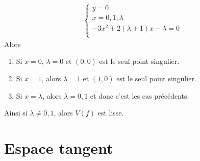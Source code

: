 \begin{expl}
\begin{enumerate}
\begin{align*}
                    \begin{cases}
                        y = 0 \\
                        x = 0,1,\lambda \\
                        -3x^2 + 2(\lambda + 1)x - \lambda = 0 \\
                    \end{cases}
                \end{align*}
                Alors
                \begin{enumerate}
                    \item Si $x = 0$, $\lambda = 0$ et $(0,0)$ est le seul point singulier.
                    \item Si $x = 1$, alors $\lambda = 1$ et $(1,0)$ est le seul point singulier.
                    \item Si $x = \lambda$, alors $\lambda = 0,1$ et donc c'est les cas précédents.
                \end{enumerate}
                Ainsi si $\lambda \neq 0,1$, alors $V(f)$ est lisse.
            \end{enumerate}
        \end{expl}

    \section{Espace tangent}
